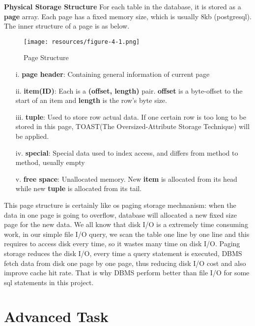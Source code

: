 \documentclass[onecolumn, oneside, ctexart, UTF8, b4paper]{SUSTechHomework}
\newcommand{\upcite}[1]{\textsuperscript{\textsuperscript{\cite{#1}}}}
\begin{document}
\noindent \textbf{Physical Storage Structure\upcite{ref1}}   For each table in the database, it is stored as a \textbf{page} array. Each page has a fixed memory size, which is usually 8kb (postgresql). The inner structure of a page is as below.

\begin{figure}[H]
    \centering
    \texttt{[image: resources/figure-4-1.png]}
    \caption{Page Structure}
    \label{fig:page_struture}
\end{figure}

\begin{enumerate}
    \item[i.]
    \textbf{page header}: Containing general information of current page
    \item[ii.]
    \textbf{item(ID)}: Each is a \textbf{(offset, length)} pair. \textbf{offset} is a byte-offset to the start of an item and \textbf{length} is the row's byte size.
    \item[iii.]
    \textbf{tuple}: Used to store row actual data. If one certain row is too long to be stored in this page, TOAST(The Oversized-Attribute Storage Technique) will be applied.
    \item[iv.]
    \textbf{special}: Special data used to index access, and differs from method to method, usually empty
    \item[v.]
    \textbf{free space}: Unallocated memory. New \textbf{item} is allocated from its head while new \textbf{tuple} is allocated from its tail.
\end{enumerate}

This page structure is certainly like os paging storage mechnanism: when the data in one page is going to overflow, database will allocated a new fixed size page for the new data.
We all know that disk I/O is a extremely time consuming work, in our simple file I/O query, we scan the table one line by one line and this requires to access disk every time, so it wastes many time on disk I/O. Paging storage reduces the disk I/O, every time a query statement is executed, DBMS fetch data from disk one page by one page, thus reducing disk I/O cost and also improve cache hit rate. That is why DBMS perform better than file I/O for some sql statements in this project.



\section{\textbf{Advanced Task}}
\end{document}
